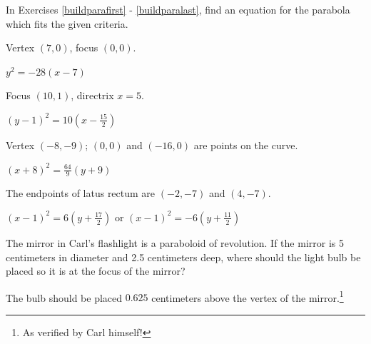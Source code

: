 \documentclass{ximera}
\begin{document}
\begin{question}
    
In Exercises \ref{buildparafirst} - \ref{buildparalast}, find an equation for the parabola which fits the given criteria.

\begin{problem}\label{buildparafirst}
    Vertex $(7, 0)$, focus $(0, 0)$.

\begin{solution}
    $y^{2} = -28(x - 7)$
\end{solution}
    
\end{problem}

\begin{problem}
    Focus $(10, 1)$, directrix $x = 5$.

\begin{solution}
    $(y - 1)^{2} = 10\left(x - \frac{15}{2} \right)$
\end{solution}
    
\end{problem}

\begin{problem}
     Vertex $(-8, -9)$; $(0, 0)$ and $(-16, 0)$ are points on the curve.

\begin{solution}
    $(x + 8)^{2} = \frac{64}{9}(y + 9)$
\end{solution}
     
\end{problem}

\begin{problem}\label{buildparalast}
    The endpoints of latus rectum are $(-2, -7)$ and $(4, -7)$.

\begin{solution}
     $(x - 1)^{2} = 6\left(y + \frac{17}{2}\right)$ or $(x - 1)^{2} = -6\left(y + \frac{11}{2}\right)$
\end{solution}
    
\end{problem}

\end{question}



\begin{problem}
  The mirror in Carl's flashlight is a paraboloid of revolution.  If the mirror is 5 centimeters in diameter and 2.5 centimeters deep, where should the light bulb be placed so it is at the focus of the mirror?

\begin{solution}
    The bulb should be placed $0.625$ centimeters above the vertex of the mirror.\footnote{As verified by Carl himself!}
\end{solution}
  
\end{problem}
\end{document}
